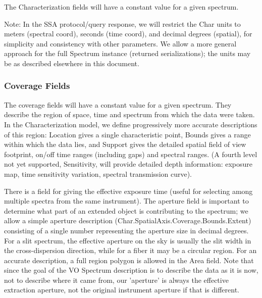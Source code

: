 \documentclass[11pt]{article}
\begin{document}
The Characterization fields will have a constant value for a given spectrum.

Note: In the SSA protocol/query response, we
will restrict the Char units to meters (spectral coord),
seconds (time coord), and decimal degrees (spatial),
for simplicity and consistency with other parameters.
We allow a more general approach for the full Spectrum 
instance (returned serializations); the units may be
as described elsewhere in this document.


\subsubsection{Coverage Fields}
                        

The coverage fields will have a constant value for a given spectrum.
They describe the region of space, time and spectrum from which the data
were taken. In the Characterization model, we define progressively more
accurate descriptions of this region: Location gives a single
characteristic point, Bounds gives a range within which the data lies,
and Support gives the detailed spatial field of view footprint, on/off
time ranges (including gaps) and spectral ranges. (A fourth level not
yet supported, Sensitivity, will provide detailed depth information:
exposure map, time sensitivity variation, spectral transmission curve).
  
There is a field for giving the effective exposure time (useful 
for selecting among multiple spectra from the same instrument). 
The aperture field is 
important to determine what part of an extended object is contributing
to the spectrum; we allow a simple aperture description (Char.SpatialAxis.Coverage.Bounds.Extent)
consisting of a single number representing the aperture size in decimal degrees.
For a slit spectrum, the effective aperture on the sky is usually the slit width
in the cross-dispersion direction, while for a fiber it may be a circular
region. For an accurate description, a full region polygon is allowed in the Area field.
Note that since the goal of the VO Spectrum description is to describe
the data as it is now, not to describe where it came from, our 'aperture'
is always the effective extraction aperture, not the original instrument
aperture if that is different.


 
\end{document}
